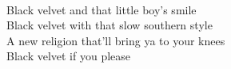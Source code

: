 \\
Black velvet and that little boy's smile \\
Black velvet with that slow southern style \\
A new religion that'll bring ya to your knees \\
Black velvet if you please \\
